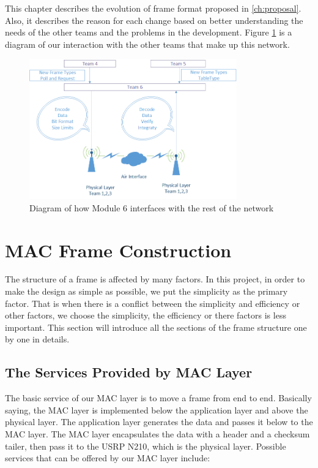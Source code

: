 This chapter describes the evolution of frame format proposed in \ref{ch:proposal}. Also, it describes the reason for each change based on better understanding the needs of the other teams and the problems in the development. Figure \ref{fig:Interface} is a diagram of our interaction with the other teams that make up this network. 
\begin{figure}[ht]
    \centering
    \includegraphics[width=0.8\textwidth]{Interface_diagram.PNG}
    \caption{Diagram of how Module 6 interfaces with the rest of the network}
    \label{fig:Interface}
\end{figure}


\section{MAC Frame Construction}
The structure of a frame is affected by many factors. In this project, in order to make the design as simple as possible, we put the simplicity as the primary factor. That is when there is a conflict between the simplicity and efficiency or other factors, we choose the simplicity, the efficiency or there factors is less important. This section will introduce all the sections of the frame structure one by one in details. 

\subsection{The Services Provided by MAC Layer}

The basic service of our MAC layer is to move a frame from end to end. Basically saying, the MAC layer is implemented below the application layer and above the physical layer. The application layer generates the data and passes it below to the MAC layer. The MAC layer encapsulates the data with a header and a checksum tailer, then pass it to the USRP N210, which is the physical layer. Possible services that can be offered by our MAC layer include: 

